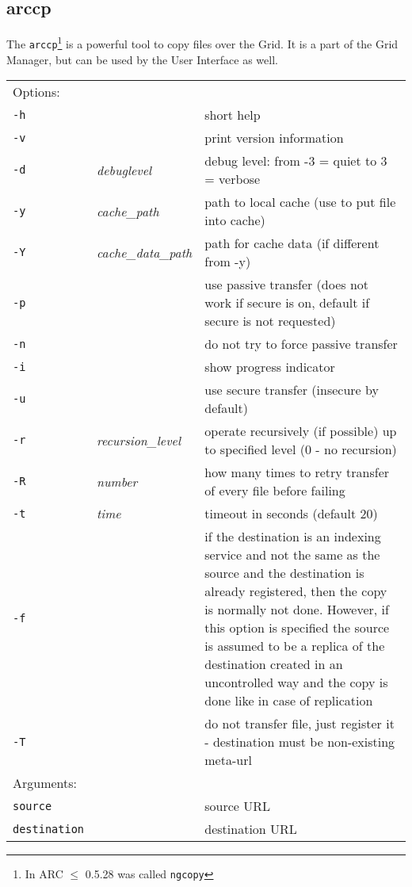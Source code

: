 \subsection{arccp}\label{sec:arccp}

The \texttt{arccp}\footnote{In ARC $\leq$ 0.5.28 was called
  \texttt{ngcopy}}  is a powerful
tool to copy files over the Grid. It is a part of the Grid Manager,
but can be used by the User Interface as well.
\hspace*{0.5cm}
\begin{shaded}
\end{shaded}
\begin{longtable}{llp{8cm}}
    Options:&&\\
    \texttt{-h} && short help\\
    \texttt{-v} && print version information\\
    \texttt{-d} & \textit{debuglevel} &debug level: from -3 = quiet to 3 = verbose\\
    \texttt{-y} & \textit{cache\_path} & path to local cache (use to put file into cache)\\
    \texttt{-Y} & \textit{cache\_data\_path} & path for cache data (if different from -y)\\
    \texttt{-p} && use passive transfer (does not work if secure is on, default if secure is not requested)\\
    \texttt{-n} && do not try to force passive transfer\\
    \texttt{-i} && show progress indicator\\
    \texttt{-u} && use secure transfer (insecure by default)\\
    \texttt{-r} & \textit{recursion\_level} & operate recursively (if possible) up to specified level (0 - no recursion)\\
    \texttt{-R} & \textit{number} & how many times to retry transfer of every file before failing\\
    \texttt{-t} & \textit{time} & timeout in seconds (default 20)\\
    \texttt{-f} && if the destination is an indexing service and not the same as the source and the destination is already registered, then the copy is normally not done. However, if this option is specified the source is assumed to be a replica of the destination created in an uncontrolled way and the copy is done like in case of replication\\
    \texttt{-T} && do not transfer file, just register it - destination must be non-existing meta-url\\
    Arguments:&&\\
    \texttt{source} && source URL\\
    \texttt{destination} && destination URL\\
\end{longtable}

